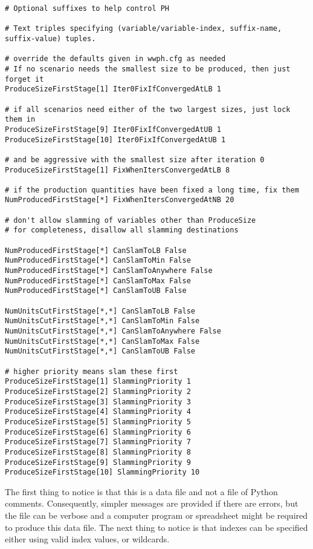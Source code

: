 {\small
\begin{verbatim}
# Optional suffixes to help control PH

# Text triples specifying (variable/variable-index, suffix-name, suffix-value) tuples.

# override the defaults given in wwph.cfg as needed
# If no scenario needs the smallest size to be produced, then just forget it
ProduceSizeFirstStage[1] Iter0FixIfConvergedAtLB 1

# if all scenarios need either of the two largest sizes, just lock them in
ProduceSizeFirstStage[9] Iter0FixIfConvergedAtUB 1
ProduceSizeFirstStage[10] Iter0FixIfConvergedAtUB 1

# and be aggressive with the smallest size after iteration 0
ProduceSizeFirstStage[1] FixWhenItersConvergedAtLB 8

# if the production quantities have been fixed a long time, fix them 
NumProducedFirstStage[*] FixWhenItersConvergedAtNB 20

# don't allow slamming of variables other than ProduceSize
# for completeness, disallow all slamming destinations

NumProducedFirstStage[*] CanSlamToLB False
NumProducedFirstStage[*] CanSlamToMin False
NumProducedFirstStage[*] CanSlamToAnywhere False
NumProducedFirstStage[*] CanSlamToMax False
NumProducedFirstStage[*] CanSlamToUB False

NumUnitsCutFirstStage[*,*] CanSlamToLB False
NumUnitsCutFirstStage[*,*] CanSlamToMin False
NumUnitsCutFirstStage[*,*] CanSlamToAnywhere False
NumUnitsCutFirstStage[*,*] CanSlamToMax False
NumUnitsCutFirstStage[*,*] CanSlamToUB False

# higher priority means slam these first
ProduceSizeFirstStage[1] SlammingPriority 1
ProduceSizeFirstStage[2] SlammingPriority 2
ProduceSizeFirstStage[3] SlammingPriority 3
ProduceSizeFirstStage[4] SlammingPriority 4
ProduceSizeFirstStage[5] SlammingPriority 5
ProduceSizeFirstStage[6] SlammingPriority 6
ProduceSizeFirstStage[7] SlammingPriority 7
ProduceSizeFirstStage[8] SlammingPriority 8
ProduceSizeFirstStage[9] SlammingPriority 9
ProduceSizeFirstStage[10] SlammingPriority 10

\end{verbatim}
}

The first thing to notice is that this is a data file and not a file of Python comments.
Consequently, simpler messages are provided if there are errors, but the file can be verbose
and a computer program or spreadsheet might be required to produce this data file. The next thing to notice
is that indexes can be specified either using valid index values, or wildcards.

